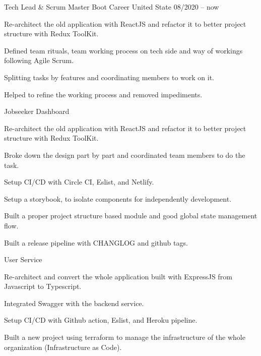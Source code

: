 \begin{cventries}
  \cventry
    {Tech Lead \& Scrum Master} %
    {Boot Career} %
    {United State} %
    {08/2020 -- now} %
    {
      \begin{cvitems} %
        \item {Re-architect the old application with ReactJS and refactor it to better project structure with Redux ToolKit.}
        \item {Defined team rituals, team working process on tech side and way of workings following Agile Scrum.}
        \item {Splitting tasks by features and coordinating members to work on it.}
        \item {Helped to refine the working process and removed impediments. }
      \end{cvitems}
    }

 \cventry
    {Jobseeker Dashboard} %
    {} %
    {} %
    {} %
    {
      \begin{cvitems} %
        \item {Re-architect the old application with ReactJS and refactor it to better project structure with Redux ToolKit.}
        \item {Broke down the design part by part and coordinated team members to do the task.}
        \item {Setup CI/CD with Circle CI, Eslist, and Netlify.}
        \item {Setup a storybook, to isolate components for independently development.}
        \item {Built a proper project structure based module and good global state management flow.}
        \item {Built a release pipeline with CHANGLOG and github tags.}
      \end{cvitems}
    }
    
\cventry
    {User Service} %
    {} %
    {} %
    {} %
    {
      \begin{cvitems} %
        \item {Re-architect and convert the whole application built with ExpressJS from Javascript to Typescript.}
        \item {Integrated Swagger with the backend service.}
        \item {Setup CI/CD with Github action, Eslist, and Heroku pipeline.}
        \item {Built a new project using terraform to manage the infrastructure of the whole organization (Infrastructure as Code).}
      \end{cvitems}
    }


\end{cventries}
